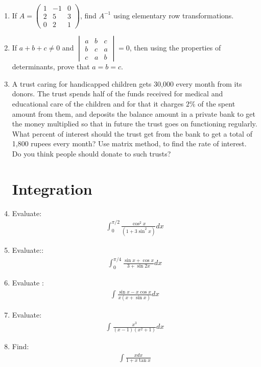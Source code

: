 \documentclass[12pt,-letter paper]{article}
\newcommand{\myvec}[1]{\ensuremath{\begin{pmatrix}#1\end{pmatrix}}}
\newcommand{\mydet}[1]{\ensuremath{\begin{vmatrix}#1\end{vmatrix}}}
\begin{document}
\begin{enumerate}
	\item If $A = \myvec{1&-1&0\\2&5&3\\0&2&1}$, find $A^{-1}$ using elementary row transformations.

	\item If $a+b+c\neq0$ and $\mydet{a&b&c\\b&c&a\\c&a&b}=0$, then using the properties of determinants, prove that $a=b=c$.

	\item A trust caring for handicapped children gets 30,000 every month from its donors. The trust spends half of the funds received for medical and educational care of the children and for that it charges $2\%$ of the spent amount from them, and deposits the balance amount in a private bank to get the money multiplied so that in future the trust goes on functioning regularly. What percent of interest should the trust get from the bank to get a total of 1,800 rupees every month? Use matrix method, to find the rate of interest. Do you think people should donate to such trusts?


\section{Integration}
	\item Evaluate: 
    \begin{align*}
         \int_0^{\pi/2} \frac{\cos^2{x}}{(1 + 3\sin^2 x)} dx
    \end{align*}
 

	\item Evaluate:: 
    \begin{align*}
        \int_0^{\pi/4} \frac{\sin{x}+\cos{x}}{3+\sin{2x}} dx
    \end{align*}

	\item Evaluate :
    \begin{align*}
        \int \frac{\sin{x}-x\cos{x}}{x(x+\sin{x})} dx
    \end{align*}

	\item Evaluate:
    \begin{align*}
        \int \frac{x^3}{(x-1)(x^2+1)} dx
    \end{align*}

	\item Find:
    \begin{align*}
         \int \frac{xdx}{1+x\tan{x}}
    \end{align*}


\end{enumerate}
\end{document}

